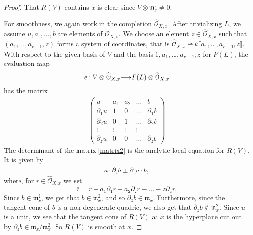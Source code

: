 \documentclass[11pt,reqno]{amsart}
\theoremstyle{plain}
\theoremstyle{definition}
\theoremstyle{remark}
\numberwithin{equation}{section}
\renewcommand{\to}{{\longrightarrow}}
\numberwithin{equation}{section}
\renewcommand{\O}{\mathcal O}
\begin{document}
\begin{proof}
  That $R(V)$ contains $x$ is clear since $V \otimes \mathfrak{m}^{2}_{x} \neq 0$.

  For smoothness, we again work in the completion $\widehat{\O}_{X,x}$.
  After trivializing $L$, we assume $u, a_{1}, ..., b$ are elements of $\widehat{\O}_{X,x}$.
  We choose an element $z \in \widehat{\O}_{X,x}$ such that $(a_1, \dots, a_{r-1}, z)$ forms a system of coordinates, that is $\widehat{\O}_{X,x} \cong k\llbracket a_{1}, \dots , a_{r-1}, z \rrbracket$.
  With respect to the given basis of $V$ and the basis $1, a_1, \dots, a_{r-1}, z$ for $P(L)$, the evaluation map
  \begin{align*}
  e\from V \otimes \widehat{\O}_{X,x} \to P(L) \otimes \widehat{\O}_{X,x}
  \end{align*}
  has the matrix
\begin{align}\label{matrix2}
\begin{pmatrix}
  u & a_{1} & a_{2} & \dots & b \\
  \partial_{1}u & 1 & 0 & \dots & \partial_{1}b \\
  \partial_{2}u & 0 & 1 & \dots & \partial_{2}b \\
  \vdots & \vdots & \vdots & \vdots \\
  \partial_{z}u  & 0 & 0 & \dots & \partial_{z}b
\end{pmatrix}
\end{align}
The determinant of the matrix \eqref{matrix2} is the analytic local equation for $R(V)$.
It is given by
\begin{align*}
   \bar{u} \cdot \partial_{z}b \pm \partial_{z}u \cdot \bar{b},
 \end{align*} 
 where, for $r \in \widehat{\O}_{X,x}$ we set
 \[\bar{r} = r - a_{1}\partial_{1}r - a_{2}\partial_{2}r - \dots - z \partial_{z} r.\]
 Since $b \in {\mathfrak m}^{2}_{x}$, we get that $\bar{b} \in {\mathfrak m}^{2}_{x}$, and so $\partial_{z}b \in {\mathfrak m}_{x}$.
 Furthermore, since the tangent cone of $b$ is a non-degenerate quadric, we also get that $\partial_z b \not \in \mathfrak m_x^2$.
 Since $\overline{u}$ is a unit, we see that the tangent cone of $R(V)$ at $x$ is the hyperplane cut out by $\partial_z b \in \mathfrak m_x/\mathfrak m_x^2$.
 So $R(V)$ is smooth at $x$.
\end{proof}
\end{document}

